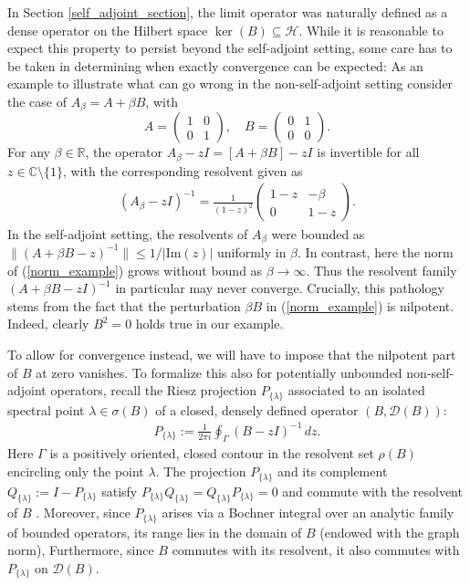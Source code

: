 \documentclass[reqno,12pt,letterpaper]{amsart}
\numberwithin{equation}{section}
\newcommand{\1}{\mathds{1}}
\theoremstyle{definition}
\begin{document}
In Section \ref{self_adjoint_section}, the limit operator was naturally 
defined as a dense operator on the Hilbert space \(\ker(B) \subseteq \mathcal{H}\). 
 While it is reasonable to expect this property to persist beyond the self-adjoint setting, some care has to be taken in determining when exactly convergence can be expected: As an example
to illustrate what can go wrong in the non-self-adjoint setting consider the case of $A_\beta = A + \beta B$, with
\[
A = \begin{pmatrix} 1 & 0 \\ 0 & 1 \end{pmatrix}, \quad B = \begin{pmatrix} 0 & 1 \\ 0 & 0 \end{pmatrix}.
\]
For any \(\beta \in \mathbb{R}\), the operator \( A_\beta - z I = [A + \beta B ]- z I \) is invertible for all \( z \in \mathds{C}\setminus\{1\} \), with the corresponding resolvent given as
\begin{align}\label{norm_example}
	(A_\beta - z I)^{-1} = \frac{1}{(1 - z)^2} \begin{pmatrix} 1 - z & -\beta \\ 0 & 1 - z \end{pmatrix}.
\end{align}
In the self-adjoint setting,  
the resolvents of $A_\beta$ were  bounded as $\|(A + \beta B -z)^{-1}\| \leq 1/|\text{Im}(z)|$ uniformly in $\beta$.
In contrast, here 
 the norm of (\ref{norm_example}) grows without bound as \(\beta \to \infty\). Thus the resolvent family \( (A + \beta B - z I)^{-1} \) in particular may never converge.
Crucially, this pathology stems from the fact that the perturbation $\beta B$ in (\ref{norm_example}) is nilpotent. Indeed, clearly $B^2 =0$ holds true in our example.



\medskip


To allow for convergence instead, we will have to impose that the nilpotent part of \(B\) at zero vanishes.
To formalize this also for potentially unbounded non-self-adjoint operators, recall the Riesz projection \( P_{\{\lambda\}} \) associated to an isolated spectral point \(\lambda \in \sigma(B)\) of a closed, densely defined operator \((B, \mathcal{D}(B))\):
\begin{align}\label{riesz_projector}
	 P_{\{\lambda\}}:= \frac{1}{2 \pi i} \oint_\Gamma (B - z I)^{-1} \, dz.
\end{align}
Here \(\Gamma\) is a positively oriented, closed contour in the resolvent set \(\rho(B)\) encircling only the point \(\lambda\). The projection \( P_{\{\lambda\}}  \) and its complement \( Q_{\{\lambda\}}  := I -  P_{\{\lambda\}} \) satisfy \(  P_{\{\lambda\}} Q_{\{\lambda\}}  = Q_{\{\lambda\}}   P_{\{\lambda\}} = 0 \) and commute with the resolvent of \( B \) \cite{HislopSigal1996}. Moreover, since \( P_{\{\lambda\}}  \) arises via a Bochner integral over an analytic family of bounded operators, its range lies in the domain of \( B \) (endowed with the graph norm), Furthermore, since $B$ commutes with its resolvent, it also commutes with \( P_{\{\lambda\}}  \) on \(\mathcal{D}(B)\).
\end{document}
